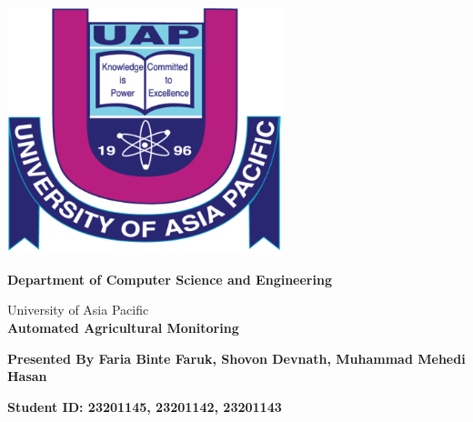 \begin{titlepage}
    \begin{center}
 \fontsize{20pt}{1cm}\selectfont \textbf{\thesistitle}

        \includegraphics[width=0.6\textwidth]{University-of-Asia-Pacific.png}
        \vspace{0.5cm}

        
       
        
        \textbf{Department of Computer Science and Engineering}

        
        University of Asia Pacific\\
 \Huge
 \vspace{0.5cm}
        \textbf{Automated Agricultural
Monitoring}

            
        \vspace{0.5cm}
        \LARGE
            
        \vspace{1.5cm}
            
        \textbf{Presented By
        Faria Binte Faruk,
        Shovon Devnath,
        Muhammad Mehedi Hasan}

         \vspace{0.5cm}
        \textbf{Student ID: 23201145, 23201142, 23201143}

        
    \end{center}
\end{titlepage}